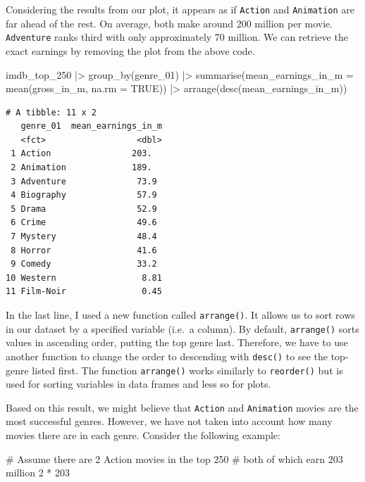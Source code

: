 \documentclass[
  letterpaper,
]{krantz}
\makeatletter
\newenvironment{Shaded}{\begin{snugshade}}{\end{snugshade}}
\newcommand{\AttributeTok}[1]{\textcolor[rgb]{0.40,0.45,0.13}{#1}}
\newcommand{\CommentTok}[1]{\textcolor[rgb]{0.37,0.37,0.37}{#1}}
\newcommand{\ConstantTok}[1]{\textcolor[rgb]{0.56,0.35,0.01}{#1}}
\newcommand{\DecValTok}[1]{\textcolor[rgb]{0.68,0.00,0.00}{#1}}
\newcommand{\FunctionTok}[1]{\textcolor[rgb]{0.28,0.35,0.67}{#1}}
\newcommand{\NormalTok}[1]{\textcolor[rgb]{0.00,0.23,0.31}{#1}}
\newcommand{\SpecialCharTok}[1]{\textcolor[rgb]{0.37,0.37,0.37}{#1}}
\newenvironment{kframe}{%
\medskip{}
\setlength{\fboxsep}{.8em}
 \def\at@end@of@kframe{}%
 \ifinner\ifhmode%
  \def\at@end@of@kframe{\end{minipage}}%
  \begin{minipage}{\columnwidth}%
 \fi\fi%
 \def\FrameCommand##1{\hskip\@totalleftmargin \hskip-\fboxsep
 \colorbox{shadecolor}{##1}\hskip-\fboxsep
     \hskip-\linewidth \hskip-\@totalleftmargin \hskip\columnwidth}%
 \MakeFramed {\advance\hsize-\width
   \@totalleftmargin\z@ \linewidth\hsize
   \@setminipage}}%
 {\par\unskip\endMakeFramed%
 \at@end@of@kframe}
\renewenvironment{Shaded}{\begin{kframe}}{\end{kframe}}
\makeatother
\begin{document}
Considering the results from our plot, it appears as if \texttt{Action}
and \texttt{Animation} are far ahead of the rest. On average, both make
around 200 million per movie. \texttt{Adventure} ranks third with only
approximately 70 million. We can retrieve the exact earnings by removing
the plot from the above code.

\begin{Shaded}
\begin{Highlighting}[]
\NormalTok{imdb\_top\_250 }\SpecialCharTok{|\textgreater{}}
  \FunctionTok{group\_by}\NormalTok{(genre\_01) }\SpecialCharTok{|\textgreater{}}
  \FunctionTok{summarise}\NormalTok{(}\AttributeTok{mean\_earnings\_in\_m =} \FunctionTok{mean}\NormalTok{(gross\_in\_m, }\AttributeTok{na.rm =} \ConstantTok{TRUE}\NormalTok{)) }\SpecialCharTok{|\textgreater{}}
  \FunctionTok{arrange}\NormalTok{(}\FunctionTok{desc}\NormalTok{(mean\_earnings\_in\_m))}
\end{Highlighting}
\end{Shaded}

\begin{verbatim}
# A tibble: 11 x 2
   genre_01  mean_earnings_in_m
   <fct>                  <dbl>
 1 Action                203.  
 2 Animation             189.  
 3 Adventure              73.9 
 4 Biography              57.9 
 5 Drama                  52.9 
 6 Crime                  49.6 
 7 Mystery                48.4 
 8 Horror                 41.6 
 9 Comedy                 33.2 
10 Western                 8.81
11 Film-Noir               0.45
\end{verbatim}

In the last line, I used a new function called \texttt{arrange()}. It
allows us to sort rows in our dataset by a specified variable (i.e.~a
column). By default, \texttt{arrange()} sorts values in ascending order,
putting the top genre last. Therefore, we have to use another function
to change the order to descending with \texttt{desc()} to see the
top-genre listed first. The function \texttt{arrange()} works similarly
to \texttt{reorder()} but is used for sorting variables in data frames
and less so for plots.

Based on this result, we might believe that \texttt{Action} and
\texttt{Animation} movies are the most successful genres. However, we
have not taken into account how many movies there are in each genre.
Consider the following example:

\begin{Shaded}
\begin{Highlighting}[]
\CommentTok{\# Assume there are 2 Action movies in the top 250}
\CommentTok{\# both of which earn 203 million}
\DecValTok{2} \SpecialCharTok{*} \DecValTok{203}
\end{Highlighting}
\end{Shaded}
\end{document}
